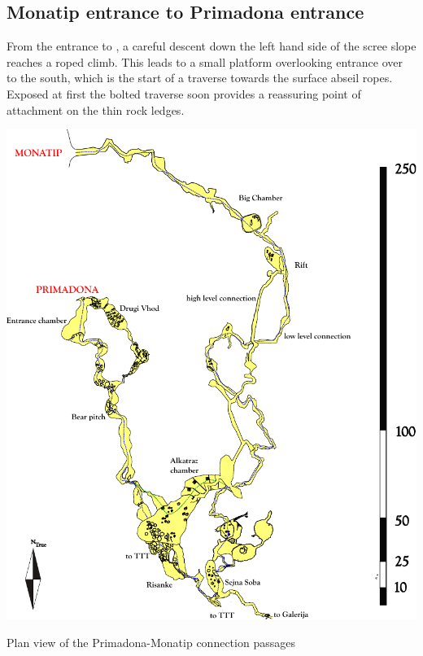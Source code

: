 \subsection{Monatip entrance to Primadona entrance}
From the entrance to , a careful descent down the left hand side of the scree slope reaches a roped climb. This leads to a small platform overlooking  entrance over to the south, which is the start of a traverse towards the surface abseil ropes. Exposed at first  the bolted traverse soon provides a reassuring point of attachment on the thin rock ledges.


\begin{pagesurvey}
\centering
\includegraphics[height=\textheight]{images/pdf_maps/prima-mona-trip.pdf}
\caption{Plan view of the Primadona-Monatip connection passages}
\label{prima mona trip}
\end{pagesurvey}
